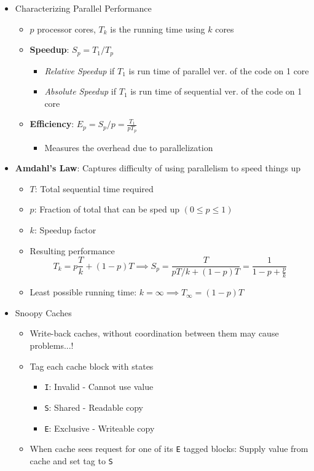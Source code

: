 \documentclass[12pt]{article}
\begin{document}
{\begin{itemize}
\begin{itemize}
				\item \texttt{psum-local}: Reduce memory references. Sum into a local variable.
			\end{itemize}
			\item Characterizing Parallel Performance
			\begin{itemize}
				\item $p$ processor cores, $T_k$ is the running time using $k$ cores
				\item \textbf{Speedup}: $S_p = T_1 / T_p$
				\begin{itemize}
					\item \textit{Relative Speedup} if $T_1$ is run time of parallel ver. of the code on 1 core
					\item \textit{Absolute Speedup} if $T_1$ is run time of sequential ver. of the code on 1 core
				\end{itemize}
				\item \textbf{Efficiency}: $E_p = S_p/p = \frac{T_1}{pT_p}$
				\begin{itemize}
					\item Measures the overhead due to parallelization
				\end{itemize}
			\end{itemize}
			\item \textbf{Amdahl's Law}: Captures difficulty of using parallelism to speed things up
			\begin{itemize}
				\item $T$: Total sequential time required
				\item $p$: Fraction of total that can be sped up $(0\leq p\leq 1)$
				\item $k$: Speedup factor
				\item Resulting performance
				$$T_k = p\frac{T}{k} + (1-p)T \implies S_p = \frac{T}{pT/k + (1-p)T} = \frac{1}{1-p + \frac{p}{k}}$$
				\item Least possible running time: $k=\infty \implies T_\infty = (1-p)T$
			\end{itemize}
			\item Snoopy Caches
			\begin{itemize}
				\item Write-back caches, without coordination between them may cause problems...!
				\item Tag each cache block with states
				\begin{itemize}
					\item \texttt{I}: Invalid - Cannot use value
					\item \texttt{S}: Shared - Readable copy
					\item \texttt{E}: Exclusive - Writeable copy
				\end{itemize}
				\item When cache sees request for one of its \texttt{E} tagged blocks: Supply value from cache and set tag to \texttt{S}
			\end{itemize}
		\end{itemize}
		
}
\end{document}
